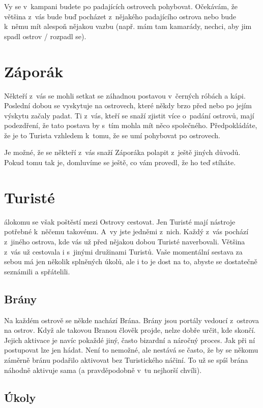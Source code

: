 \documentclass[a4paper,twocolumn,openany,nodeprecatedcode, justified]{dndbook}
\begin{document}
	Vy se v~kampani budete po padajících ostrovech pohybovat. Očekávám, že
	většina z~vás bude buď pocházet z~nějakého padajícího ostrova nebo bude
k~němu mít alespoň nějakou vazbu (např. mám tam kamarády, nechci, aby jim
	spadl ostrov / rozpadl se).
	
	\section{Záporák}
	Někteří z~vás se mohli setkat se záhadnou postavou v~černých róbách a kápi.
	Poslední dobou se vyskytuje na ostrovech, které někdy brzo před nebo po jejím
	výskytu začaly padat. Ti z~vás, kteří se snaží zjistit více o~padání ostrovů, mají
	podezdření, že tato postava by s~tím mohla mít něco společného. Předpokládáte,
	že je to Turista vzhledem k~tomu, že se umí pohybovat po ostrovech.
	
	Je možné, že se někteří z~vás snaží Záporáka polapit z~ještě jiných důvodů.
	Pokud tomu tak je, domluvíme se ještě, co vám provedl, že ho teď stíháte.
	
	
	
	\section{Turisté}
	
	álokomu se však poštěstí mezi Ostrovy cestovat. Jen Turisté mají nástroje potřebné k~něčemu takovému. A~vy jste jedněmi z~nich. Každý z~vás pochází z~jiného ostrova, kde vás už před nějakou dobou Turisté naverbovali. Většina z~vás už cestovala i s~jinými družinami Turistů. Vaše momentální sestava za sebou má jen několik splněných úkolů, ale i to je dost na to, abyste se dostatečně seznámili a spřátelili.
	
	\subsection{Brány}
	
	Na každém ostrově se někde nachází Brána. Brány jsou portály vedoucí z~ostrova na ostrov. Když ale takovou Branou člověk projde, nelze dobře určit, kde skončí. Jejich aktivace je navíc pokaždé jiný, často bizardní a náročný proces. Jak při ní postupovat lze jen hádat. Není to nemožné, ale nestává se často, že by se někomu záměrně bránu podařilo aktivovat bez Turistického náčiní. To už se spíš brána náhodně aktivuje sama (a pravděpodobně v~tu nejhorší chvíli).
	
	\subsection{Úkoly}
	
\end{document}

